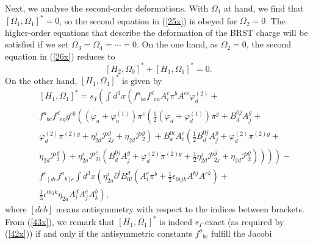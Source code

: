 \documentclass[a4paper,12pt]{article}
\begin{document}
Next, we analyse the second-order deformations. With $\Omega _{1}$ at hand,
we find that $\left[ \Omega _{1},\Omega _{1}\right] ^{*}=0$, so the second
equation in (\ref{25x}) is obeyed for $\Omega _{2}=0$. The higher-order
equations that describe the deformation of the BRST charge will be satisfied
if we set $\Omega _{3}=\Omega _{4}=\cdots =0$. On the one hand, as $\Omega
_{2}=0$, the second equation in (\ref{26x}) reduces to 
\begin{equation}
\left[ H_{2},\Omega _{0}\right] ^{*}+\left[ H_{1},\Omega _{1}\right] ^{*}=0.
\label{42x}
\end{equation}
On the other hand, $\left[ H_{1},\Omega _{1}\right] ^{*}$ is given by 
\begin{eqnarray}
& &\left[ H_{1},\Omega _{1}\right] ^{*}=s_{I}\left( \int d^{3}x\left(
f_{\;\;bc}^{a}f_{\;\;ea}^{d}A_{i}^{c}\pi ^{b}A^{ei}\varphi _{d}^{\left(
2\right) }+\right. \right.  \nonumber \\
& &f_{\;\;bc}^{a}f_{\;\;eg}^{d}g^{eb}\left( \left( \varphi _{a}+\varphi
_{a}^{\left( 1\right) }\right) \pi ^{c}\left( \frac{1}{2}\left( \varphi
_{d}+\varphi _{d}^{\left( 1\right) }\right) \pi
^{g}+B_{d}^{0j}A_{j}^{g}+\right. \right.  \nonumber \\
& &\left. \varphi _{d}^{\left( 2\right) }\pi ^{\left( 2\right) g}+ \eta
_{2d}^{j}\mathcal{P}_{2j}^{g}+\eta _{2d}\mathcal{P}_{2}^{g}\right)
+B_{a}^{0i}A_{i}^{c}\left( \frac{1}{2}B_{d}^{0j}A_{j}^{g}+\varphi
_{d}^{\left( 2\right) }\pi ^{\left( 2\right) g}+\right.  \nonumber \\
& &\left. \left. \left. \left. \eta _{2d}\mathcal{P}_{2}^{g}\right) + \eta
_{2a}^{i}\mathcal{P}_{2i}^{c}\left( B_{d}^{0j}A_{j}^{g}+\varphi _{d}^{\left(
2\right) }\pi ^{\left( 2\right) g}+\frac{1}{2}\eta _{2d}^{j}\mathcal{P}%
_{2j}^{g}+\eta _{2d}\mathcal{P}_{2}^{g}\right) \right) \right) \right) - 
\nonumber \\
& &f_{\;\;\left[ de\right. }^{c} f_{\;\;\left. b\right] c}^{a}\int
d^{3}x\left( \eta _{2a}^{i}\partial ^{l}B_{0l}^{d}\left( A_{i}^{e}\pi ^{b}+%
\frac{1}{2}\epsilon _{0ijk}A^{bj}A^{ek}\right) +\right.  \nonumber \\
& &\left. \frac{1}{3}\epsilon ^{0ijk}\eta
_{2a}A_{i}^{d}A_{j}^{e}A_{k}^{b}\right) ,  \label{43x}
\end{eqnarray}
where $\left[ deb\right] $ means antisymmetry with respect to the indices
between brackets. From (\ref{43x}), we remark that $\left[ H_{1},\Omega
_{1}\right] ^{*}$ is indeed $s_{I}$-exact (as required by (\ref{42x})) if
and only if the antisymmetric constants $f_{\;\;bc}^{a}$ fulfill the Jacobi
\end{document}
